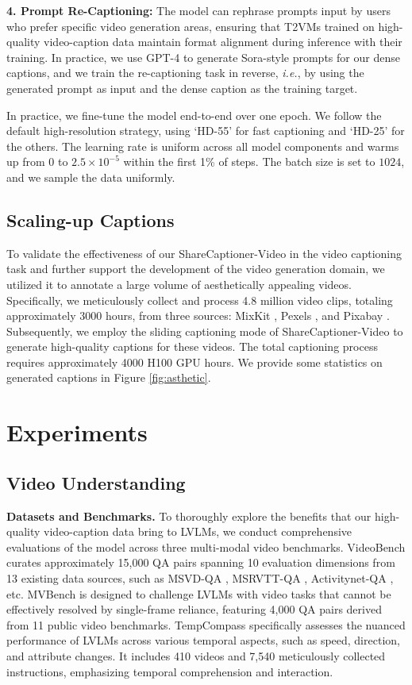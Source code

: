 \noindent\textbf{4. Prompt Re-Captioning:} The model can rephrase prompts input by users who prefer specific video generation areas, ensuring that T2VMs trained on high-quality video-caption data maintain format alignment during inference with their training. In practice, we use GPT-4 to generate Sora-style prompts for our dense captions, and we train the re-captioning task in reverse, \textit{i.e.}, by using the generated prompt as input and the dense caption as the training target.  

In practice, we fine-tune the model end-to-end over one epoch. We follow the default high-resolution strategy, using ‘HD-55’ for fast captioning and ‘HD-25’ for the others. The learning rate is uniform across all model components and warms up from 0 to $2.5\times 10^{-5}$ within the first 1\% of steps. The batch size is set to $1024$, and we sample the data uniformly.

\subsection{Scaling-up Captions}

To validate the effectiveness of our ShareCaptioner-Video in the video captioning task and further support the development of the video generation domain, we utilized it to annotate a large volume of aesthetically appealing videos. Specifically, we meticulously collect and process 4.8 million video clips, totaling approximately 3000 hours, from three sources: MixKit \cite{mixkit}, Pexels \cite{pexels}, and Pixabay \cite{pixabay}. Subsequently, we employ the sliding captioning mode of ShareCaptioner-Video to generate high-quality captions for these videos. The total captioning process requires approximately 4000 H100 GPU hours. We provide some statistics on generated captions in Figure \ref{fig:asthetic}.

\section{Experiments}
\subsection{Video Understanding}
\textbf{Datasets and Benchmarks.}
To thoroughly explore the benefits that our high-quality video-caption data bring to LVLMs, we conduct comprehensive evaluations of the model across three multi-modal video benchmarks. VideoBench \cite{ning2023video} curates approximately 15,000 QA pairs spanning 10 evaluation dimensions from 13 existing data sources, such as MSVD-QA \cite{xu2017video}, MSRVTT-QA \cite{xu2017video}, Activitynet-QA \cite{yu2019activitynet}, etc. MVBench \cite{li2023mvbench} is designed to challenge LVLMs with video tasks that cannot be effectively resolved by single-frame reliance, featuring 4,000 QA pairs derived from 11 public video benchmarks. TempCompass \cite{liu2024tempcompass} specifically assesses the nuanced performance of LVLMs across various temporal aspects, such as speed, direction, and attribute changes. It includes 410 videos and 7,540 meticulously collected instructions, emphasizing temporal comprehension and interaction.

